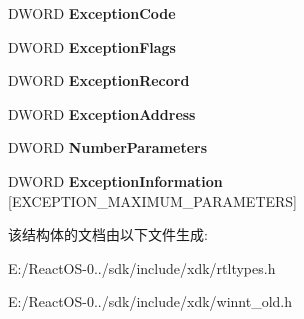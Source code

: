 \begin{DoxyCompactItemize}
D\+W\+O\+RD {\bfseries Exception\+Code}
\item 
\mbox{\label{struct___e_x_c_e_p_t_i_o_n___r_e_c_o_r_d32_a87599027798ab9fb8fcdfa29cd05680a}} 
D\+W\+O\+RD {\bfseries Exception\+Flags}
\item 
\mbox{\label{struct___e_x_c_e_p_t_i_o_n___r_e_c_o_r_d32_a004165fbaa43c4b1019c8254e742b243}} 
D\+W\+O\+RD {\bfseries Exception\+Record}
\item 
\mbox{\label{struct___e_x_c_e_p_t_i_o_n___r_e_c_o_r_d32_a1925334d6c135007c68ed6a8127eca6a}} 
D\+W\+O\+RD {\bfseries Exception\+Address}
\item 
\mbox{\label{struct___e_x_c_e_p_t_i_o_n___r_e_c_o_r_d32_abf7dc9491c406bfa3869f341b6604e97}} 
D\+W\+O\+RD {\bfseries Number\+Parameters}
\item 
\mbox{\label{struct___e_x_c_e_p_t_i_o_n___r_e_c_o_r_d32_a8c8916cbd19fd1445e11418db78f1cd0}} 
D\+W\+O\+RD {\bfseries Exception\+Information} \mbox{[}E\+X\+C\+E\+P\+T\+I\+O\+N\+\_\+\+M\+A\+X\+I\+M\+U\+M\+\_\+\+P\+A\+R\+A\+M\+E\+T\+E\+RS\mbox{]}
\end{DoxyCompactItemize}


该结构体的文档由以下文件生成\+:\begin{DoxyCompactItemize}
\item 
E\+:/\+React\+O\+S-\/0../sdk/include/xdk/rtltypes.\+h\item 
E\+:/\+React\+O\+S-\/0../sdk/include/xdk/winnt\+\_\+old.\+h\end{DoxyCompactItemize}
